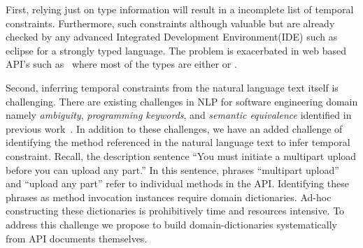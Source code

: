 First, relying just on type information will result in a incomplete list of temporal constraints. 
Furthermore, such constraints although valuable but are already checked by any advanced Integrated Development Environment(IDE) such as eclipse
for a strongly typed language.
The problem is exacerbated in web based API's such as \amazonAPI\ where most of the types are either  or .

Second, inferring temporal constraints from the natural language text itself is challenging. 
There are existing challenges in NLP for software engineering domain namely \textit{ambiguity}, \textit{programming keywords}, and \textit{semantic equivalence} identified in previous work~\cite{pandita12:inferring}.
In addition to these challenges, we have an added challenge of identifying the method referenced in the natural language text to infer temporal constraint.
Recall, the description sentence ``You must initiate a multipart upload before you can upload any part.''
In this sentence, phrases ``multipart upload'' and ``upload any part'' refer to individual methods in the API.
Identifying these phrases as method invocation instances require domain dictionaries.
Ad-hoc constructing these dictionaries is prohibitively time and resources intensive.
To address this challenge we propose to build domain-dictionaries systematically from API documents themselves.  









